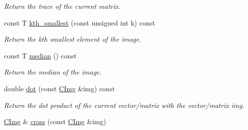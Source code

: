 \begin{DoxyCompactItemize}
\begin{DoxyCompactList}\small\item\em Return the trace of the current matrix. \item\end{DoxyCompactList}\item 
\hypertarget{structcimg__library_1_1_c_img_ac37f8186597093b8965a233fe191159d}{
const T \hyperlink{structcimg__library_1_1_c_img_ac37f8186597093b8965a233fe191159d}{kth\_\-smallest} (const unsigned int k) const }
\label{structcimg__library_1_1_c_img_ac37f8186597093b8965a233fe191159d}

\begin{DoxyCompactList}\small\item\em Return the kth smallest element of the image. \item\end{DoxyCompactList}\item 
\hypertarget{structcimg__library_1_1_c_img_a1d86298850f10e5c23f12bc7d0d76cef}{
const T \hyperlink{structcimg__library_1_1_c_img_a1d86298850f10e5c23f12bc7d0d76cef}{median} () const }
\label{structcimg__library_1_1_c_img_a1d86298850f10e5c23f12bc7d0d76cef}

\begin{DoxyCompactList}\small\item\em Return the median of the image. \item\end{DoxyCompactList}\item 
\hypertarget{structcimg__library_1_1_c_img_a5715551ea29f928aa02909654415a75f}{
double \hyperlink{structcimg__library_1_1_c_img_a5715551ea29f928aa02909654415a75f}{dot} (const \hyperlink{structcimg__library_1_1_c_img}{CImg} \&img) const }
\label{structcimg__library_1_1_c_img_a5715551ea29f928aa02909654415a75f}

\begin{DoxyCompactList}\small\item\em Return the dot product of the current vector/matrix with the vector/matrix {\ttfamily img}. \item\end{DoxyCompactList}\item 
\hypertarget{structcimg__library_1_1_c_img_af6f42ca92cd93bbe27a419297d5efa07}{
\hyperlink{structcimg__library_1_1_c_img}{CImg} \& \hyperlink{structcimg__library_1_1_c_img_af6f42ca92cd93bbe27a419297d5efa07}{cross} (const \hyperlink{structcimg__library_1_1_c_img}{CImg} \&img)}
\label{structcimg__library_1_1_c_img_af6f42ca92cd93bbe27a419297d5efa07}


\end{DoxyCompactItemize}
